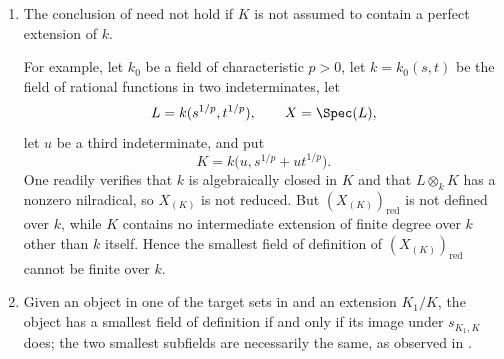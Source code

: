 \begin{remarks}[4.8.15]
\label{IV.4.8.15}
\begin{enumerate}
\item[\rm(i)]
\label{IV.4.8.15.i}
The conclusion of  need not hold if $K$ is not
assumed to contain a perfect extension of $k$.

For example, let $k_0$ be a field of characteristic $p>0$, let
$k=k_0(s,t)$ be the field of rational functions in two
indeterminates, let
\[
L=k(s^{1/p},t^{1/p}),
\qquad
X=\Spec(L),
\]
let $u$ be a third indeterminate, and put
\[
K=k\bigl(u,s^{1/p}+ut^{1/p}\bigr).
\]
One readily verifies that $k$ is algebraically closed in $K$ and that
$L\otimes_kK$ has a nonzero nilradical, so $X_{(K)}$ is not reduced.
But $(X_{(K)})_{\mathrm{red}}$ is not defined over $k$, while $K$
contains no intermediate extension of finite degree over $k$ other
than $k$ itself.
Hence the smallest field of definition of
$(X_{(K)})_{\mathrm{red}}$ cannot be finite over $k$.

\item[\rm(ii)]
\label{IV.4.8.15.ii}
Given an object in one of the target sets in  and an
extension $K_1/K$, the object has a smallest field of definition if
and only if its image under $s_{K_1,K}$ does; the two smallest
subfields are necessarily the same, as observed in
.
\end{enumerate}
\end{remarks}
